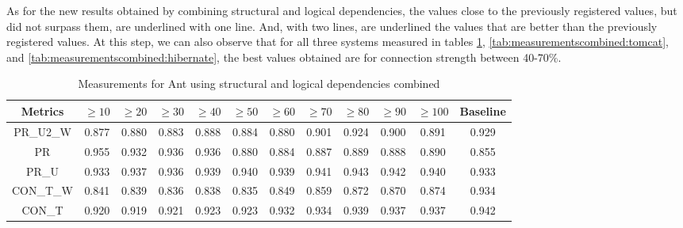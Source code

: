 \documentclass[runningheads]{comsis2}
\begin{document}
As for the new results obtained by combining structural and logical dependencies, the values close to the previously registered values, but did not surpass them, are underlined with one line. And, with two lines, are underlined the values that are better than the previously registered values. At this step, we can also observe that for all three systems measured in tables \ref{tab:measurementscombined:ant}, \ref{tab:measurementscombined:tomcat}, and \ref{tab:measurementscombined:hibernate}, the best values obtained are for connection strength between 40-70\%.

\begin{table}[!h]
\setlength\tabcolsep{3.5pt}
\caption{Measurements for Ant using structural and logical dependencies combined}
\label{tab:measurementscombined:ant}
\centering
\begin{tabular}{|c|cccccccccc|c|}
\hline
Metrics &	$\geq10$	&	$\geq20$		&	$\geq30$		&	$\geq40$		&	$\geq50$		&	$\geq60$		&	$\geq70$		&	$\geq80$		&	$\geq90$		&	$\geq100$		&	Baseline \\
\hline

PR\_U2\_W	&	0.877	&	0.880	&	0.883	&	0.888	&	0.884	&	0.880	&	0.901	&	0.924	&	0.900	&	0.891	&	0.929	\\
PR	&	0.955	&	0.932	&	0.936	&	0.936	&	0.880	&	0.884	&	0.887	&	0.889	&	0.888	&	0.890	&	0.855	\\
PR\_U	&	0.933	&	0.937	&	0.936	&	0.939	&	0.940	&	0.939	&	0.941	&	0.943	&	0.942	&	0.940	&	0.933	\\
CON\_T\_W	&	0.841	&	0.839	&	0.836	&	0.838	&	0.835	&	0.849	&	0.859	&	0.872	&	0.870	&	0.874	&	0.934	\\
CON\_T	&	0.920	&	0.919	&	0.921	&	0.923	&	0.923	&	0.932	&	0.934	&	0.939	&	0.937	&	0.937	&	0.942	\\

\hline
\end{tabular}
\end{table}
\end{document}

